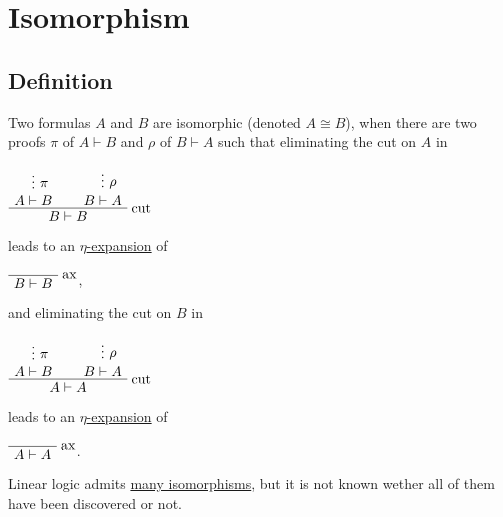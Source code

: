 \section{Isomorphism}\label{isomorphism}

\subsection{Definition}

Two formulas \(A\) and \(B\) are isomorphic (denoted \(A\cong B\)), when
there are two proofs \(\pi\) of \(A \vdash B\) and \(\rho\) of
\(B \vdash A\) such that eliminating the cut on \(A\) in

\(\AxRule{}\VdotsRule{\pi}{A \vdash B}\AxRule{}\VdotsRule{\rho}{B \vdash A}\LabelRule{\rulename{cut}}\BinRule{B\vdash B}\DisplayProof\)

leads to an
\href{Sequent_calculus\#Expansion_of_identities}{\(\eta\)-expansion} of

\(\LabelRule{\rulename{ax}}\NulRule{B\vdash B}\DisplayProof\),

and eliminating the cut on \(B\) in

\(\AxRule{}\VdotsRule{\pi}{A \vdash B}\AxRule{}\VdotsRule{\rho}{B \vdash A}\LabelRule{\rulename{cut}}\BinRule{A\vdash A}\DisplayProof\)

leads to an
\href{Sequent_calculus\#Expansion_of_identities}{\(\eta\)-expansion} of

\(\LabelRule{\rulename{ax}}\NulRule{A\vdash A}\DisplayProof\).

Linear logic admits \href{List_of_isomorphisms}{many isomorphisms}, but
it is not known wether all of them have been discovered or not.


